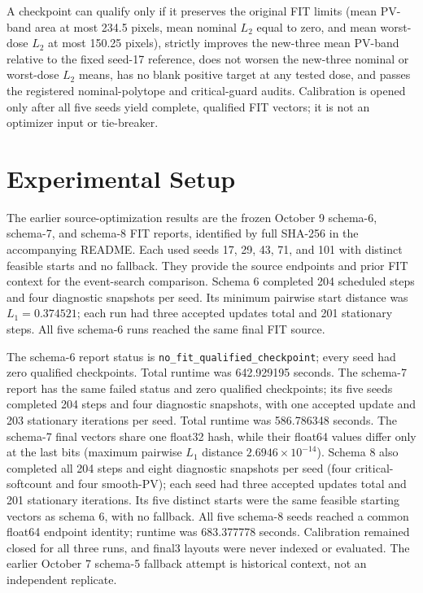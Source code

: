\documentclass[conference]{IEEEtran}
\begin{document}
A checkpoint can qualify only if it preserves the original FIT limits (mean PV-band area at most 234.5 pixels, mean nominal $L_2$ equal to zero, and mean worst-dose $L_2$ at most 150.25 pixels), strictly improves the new-three mean PV-band relative to the fixed seed-17 reference, does not worsen the new-three nominal or worst-dose $L_2$ means, has no blank positive target at any tested dose, and passes the registered nominal-polytope and critical-guard audits. Calibration is opened only after all five seeds yield complete, qualified FIT vectors; it is not an optimizer input or tie-breaker.

\section{Experimental Setup}
The earlier source-optimization results are the frozen October 9 schema-6, schema-7, and schema-8 FIT reports, identified by full SHA-256 in the accompanying README. Each used seeds 17, 29, 43, 71, and 101 with distinct feasible starts and no fallback. They provide the source endpoints and prior FIT context for the event-search comparison. Schema 6 completed 204 scheduled steps and four diagnostic snapshots per seed. Its minimum pairwise start distance was $L_1=0.374521$; each run had three accepted updates total and 201 stationary steps. All five schema-6 runs reached the same final FIT source.

The schema-6 report status is \texttt{no\_fit\_qualified\_checkpoint}; every seed had zero qualified checkpoints. Total runtime was 642.929195 seconds. The schema-7 report has the same failed status and zero qualified checkpoints; its five seeds completed 204 steps and four diagnostic snapshots, with one accepted update and 203 stationary iterations per seed. Total runtime was 586.786348 seconds. The schema-7 final vectors share one float32 hash, while their float64 values differ only at the last bits (maximum pairwise $L_1$ distance $2.6946\times10^{-14}$). Schema 8 also completed all 204 steps and eight diagnostic snapshots per seed (four critical-softcount and four smooth-PV); each seed had three accepted updates total and 201 stationary iterations. Its five distinct starts were the same feasible starting vectors as schema 6, with no fallback. All five schema-8 seeds reached a common float64 endpoint identity; runtime was 683.377778 seconds. Calibration remained closed for all three runs, and final3 layouts were never indexed or evaluated. The earlier October 7 schema-5 fallback attempt is historical context, not an independent replicate.
\end{document}
